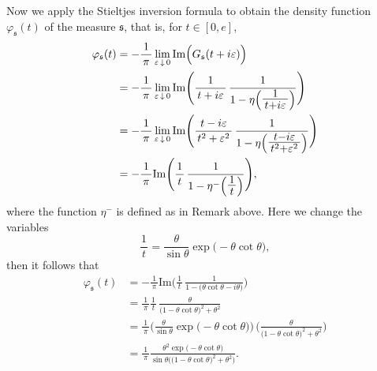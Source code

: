 \documentclass[12pt]{amsart}
\theoremstyle{definition}
\numberwithin{equation}{section}
\begin{document}
Now we apply the Stieltjes inversion formula to obtain the 
density function $\varphi_{\mathfrak{s}} (t)$ of the measure ${\mathfrak{s}}$, that is, 
for $t \in [ 0, e ]$, 
$$
 \begin{aligned}
  \varphi_{\mathfrak{s}} (t) 
     & = - \frac{1}{\, \pi \,} 
         \lim_{\varepsilon \, \downarrow \, 0} 
         \mathrm{Im} \Big( G_{\mathfrak{s}} (t + i \varepsilon) \Big) \\
     & = - \frac{1}{\, \pi \,} 
         \lim_{\varepsilon \, \downarrow \, 0} 
         \mathrm{Im} \Bigg(
           \frac{1}{\, t + i \varepsilon \,} \, 
           \frac{1}{1 - \eta \Big( 
                     \mbox{\Large $\frac{1}{\, t + i \varepsilon \,}$} 
                    \Big)}\Bigg) \\
     & = - \frac{1}{\, \pi \,} 
         \lim_{\varepsilon \, \downarrow \, 0} 
         \mathrm{Im} \Bigg(
           \frac{\, t - i \varepsilon \,}{\, t^2 + \varepsilon^2 \,} \, 
           \frac{1}{1 - \eta \Big( 
                     \mbox{\Large $\frac{\, t - i \varepsilon \,}
                                        {\, t^2 + \varepsilon^2 \,}$} 
                    \Big)}\Bigg) \\
     & = - \frac{1}{\, \pi \,} 
         \mathrm{Im} \Bigg(
           \frac{1}{\, t \,} \, 
           \frac{1}{1 - \eta^{-} \Big( 
                     \mbox{\Large $\frac{1}{\, t\,}$} 
                     \Big)}\Bigg) ,
 \end{aligned}
$$
where the function $\eta^{-}$ is defined as in Remark above.
Here we change the variables 
$$
   \frac{1}{\, t\,} 
 = \frac{\theta}{\sin \theta} \exp \big( - \theta \cot \theta \big),
$$
then it follows that
$$
 \begin{aligned}
  \varphi_{\mathfrak{s}} (t) 
     &= - \frac{1}{\, \pi \,} 
         \mathrm{Im} \Bigg(
           \frac{1}{\, t \,} \, 
           \frac{1}{1 - \big( \theta \cot \theta  -  i \theta \big)}\Bigg) \\
     &=   \frac{1}{\, \pi \,} 
           \frac{1}{\, t \,} \, 
           \frac{\theta}
           {\big(1 - \theta \cot \theta \big)^2  + \theta^2} \\
     &= \frac{1}{\, \pi \,} 
       \Big( 
       \frac{\theta}{\sin \theta} \exp \big( - \theta \cot \theta \big) 
       \Big) \, 
       \Bigg( \frac{ \theta}
              {\big(1 - \theta \cot \theta \big)^2  + \theta^2}\Bigg) \\
     &= \frac{1}{\, \pi \,} 
       \frac{\theta^2 \exp \big( - \theta \cot \theta \big) }
       {\sin \theta 
          \Big( \big(1 - \theta \cot \theta \big)^2  + \theta^2 \Big)} .
 \end{aligned}
$$
\end{document}
